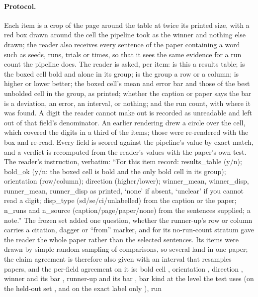 \documentclass{article}
\begin{document}
\paragraph{Protocol.} Each item is a crop of the page around the table at
twice its printed size, with a red box drawn around the cell the pipeline
took as the winner and nothing else drawn; the reader also receives every
sentence of the paper containing a word such as seeds, runs, trials or times,
so that it sees the same evidence for a run count the pipeline does. The
reader is asked, per item: is this a results table; is the boxed cell bold
and alone in its group; is the group a row or a column; is higher or lower
better; the boxed cell's mean and error bar and those of the best unbolded
cell in the group, as printed; whether the caption or paper says the bar is a
deviation, an error, an interval, or nothing; and the run count, with where it
was found. A digit the reader cannot make out is recorded as unreadable and
left out of that field's denominator. An earlier rendering drew a circle over
the cell, which covered the digits in a third of the items; those were
re-rendered with the box and re-read. Every field is scored against the
pipeline's value by exact match, and a verdict is recomputed from the reader's
values with the paper's own test. The reader's instruction, verbatim: ``For
this item record: results\_table (y/n); bold\_ok (y/n: the boxed cell is bold
and the only bold cell in its group); orientation (row/column); direction
(higher/lower); winner\_mean, winner\_disp, runner\_mean, runner\_disp as
printed, `none' if absent, `unclear' if you cannot read a digit; disp\_type
(sd/se/ci/unlabelled) from the caption or the paper; n\_runs and n\_source
(caption/page/paper/none) from the sentences supplied; a note.'' The frozen
set added one question, whether the runner-up's row or column carries a
citation, dagger or ``from'' marker, and for its no-run-count stratum gave the
reader the whole paper rather than the selected sentences. Its items were
drawn by simple random sampling of comparisons, so several land in one paper;
the claim agreement is therefore also given with an interval that resamples
papers, and the per-field agreement on it is: bold cell \nGoldFrozenBold{},
orientation \nGoldFrozenOrientation{}, direction \nGoldFrozenDirection{},
winner \nGoldFrozenWinner{} and its bar \nGoldFrozenWinnerDisp{}, runner-up
\nGoldFrozenRunner{} and its bar \nGoldFrozenRunnerDisp{}, bar kind at the
level the test uses \nGoldFrozenKind{} (on the held-out set
\nGoldHeldKind{}, and on the exact label only \nGoldHeldKindLiteral{}), run
\end{document}
